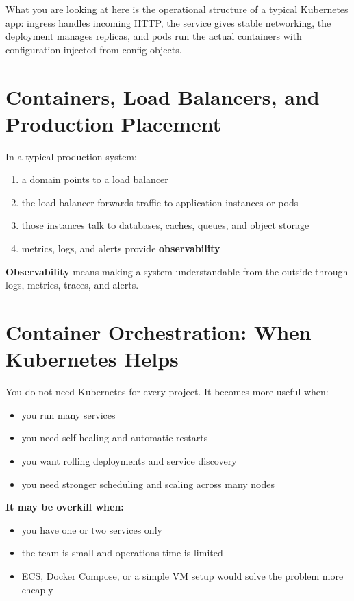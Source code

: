 \documentclass[12pt, a4paper, oneside]{book}
\begin{document}
What you are looking at here is the operational structure of a typical Kubernetes app: ingress handles incoming HTTP, the service gives stable networking, the deployment manages replicas, and pods run the actual containers with configuration injected from config objects.

\section{Containers, Load Balancers, and Production Placement}

In a typical production system:
\begin{enumerate}[leftmargin=2em]
    \item a domain points to a load balancer
    \item the load balancer forwards traffic to application instances or pods
    \item those instances talk to databases, caches, queues, and object storage
    \item metrics, logs, and alerts provide \textbf{observability}
\end{enumerate}

\textbf{Observability} means making a system understandable from the outside through logs, metrics, traces, and alerts.

\section{Container Orchestration: When Kubernetes Helps}

You do not need Kubernetes for every project. It becomes more useful when:
\begin{itemize}[leftmargin=2em]
    \item you run many services
    \item you need self-healing and automatic restarts
    \item you want rolling deployments and service discovery
    \item you need stronger scheduling and scaling across many nodes
\end{itemize}

\textbf{It may be overkill when:}
\begin{itemize}[leftmargin=2em]
    \item you have one or two services only
    \item the team is small and operations time is limited
    \item ECS, Docker Compose, or a simple VM setup would solve the problem more cheaply
\end{itemize}
\end{document}
